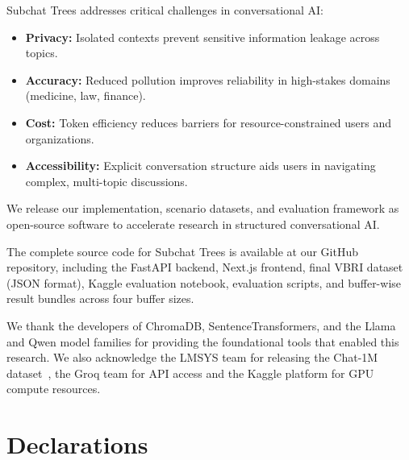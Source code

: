 \documentclass[pdflatex,sn-mathphys-num]{sn-jnl}%
\theoremstyle{thmstyleone}%
\theoremstyle{thmstyletwo}%
\theoremstyle{thmstylethree}%
\begin{document}
Subchat Trees addresses critical challenges in conversational AI:
\begin{itemize}
    \item \textbf{Privacy:} Isolated contexts prevent sensitive information leakage across topics.
    \item \textbf{Accuracy:} Reduced pollution improves reliability in high-stakes domains (medicine, law, finance).
    \item \textbf{Cost:} Token efficiency reduces barriers for resource-constrained users and organizations.
    \item \textbf{Accessibility:} Explicit conversation structure aids users in navigating complex, multi-topic discussions.
\end{itemize}

We release our implementation, scenario datasets, and evaluation framework as open-source software to accelerate research in structured conversational AI.



The complete source code for Subchat Trees is available at our GitHub repository, including the FastAPI backend, Next.js frontend, final VBRI dataset (JSON format), Kaggle evaluation notebook, evaluation scripts, and buffer-wise result bundles across four buffer sizes.


We thank the developers of ChromaDB, SentenceTransformers, and the Llama and Qwen model families for providing the foundational tools that enabled this research. We also acknowledge the LMSYS team for releasing the Chat-1M dataset~\cite{zheng2024lmsyschat}, the Groq team for API access and the Kaggle platform for GPU compute resources.

\backmatter

\section*{Declarations}
\end{document}
